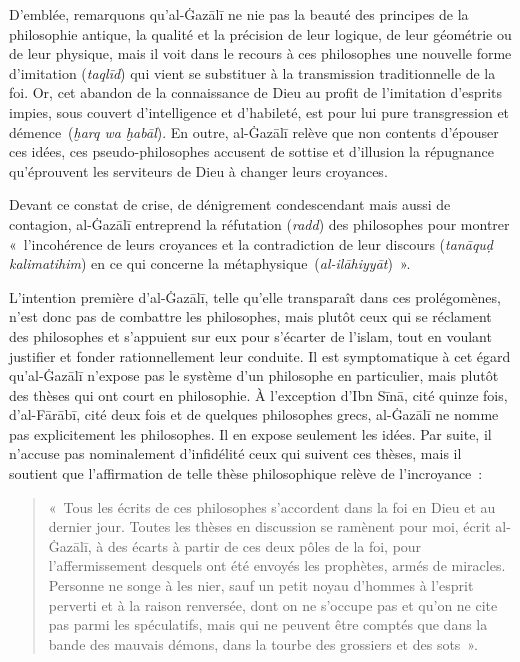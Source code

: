 D'emblée, remarquons qu'al-Ġazālī \label{theol:AlGazali4} ne nie pas la beauté des principes de
la philosophie antique, la qualité et la précision de leur logique, de
leur géométrie ou de leur physique, mais il voit dans le recours à ces
philosophes une nouvelle forme d'imitation (\emph{taqlīd}) qui vient se
substituer à la transmission traditionnelle de la foi. Or, cet abandon
de la connaissance de Dieu au profit de l'imitation d'esprits impies,
sous couvert d'intelligence et d'habileté, est pour lui pure
transgression et démence~(\emph{ḫarq wa ḫabāl}). En outre, al-Ġazālī relève que non contents d'épouser ces
idées, ces pseudo-philosophes accusent de sottise et d'illusion la
répugnance qu'éprouvent les serviteurs de Dieu à changer leurs
croyances.

Devant ce constat de crise, de dénigrement condescendant mais aussi de
contagion, al-Ġazālī  \label{theol:AlGazali5} entreprend la réfutation (\emph{radd}) des
philosophes pour montrer «~l'incohérence de leurs croyances et la
contradiction de leur discours (\emph{tanāquḍ kalimatihim}) en ce qui
concerne la métaphysique~(\emph{al-ilāhiyyāt})~».

L'intention première d'al-Ġazālī, telle qu'elle transparaît dans ces
prolégomènes, n'est donc pas de combattre les philosophes, mais plutôt
ceux qui se réclament des philosophes et s'appuient sur eux pour
s'écarter de l'islam, tout en voulant justifier et fonder
rationnellement leur conduite. Il est symptomatique à cet égard
qu'al-Ġazālī n'expose pas le système d'un philosophe en particulier,
mais plutôt des thèses qui ont court en philosophie. À l'exception d'Ibn
Sīnā, cité quinze fois, d'al-Fārābī, cité deux fois et de quelques
philosophes grecs, al-Ġazālī \label{theol:AlGazali6} ne nomme pas explicitement les philosophes.
Il en expose seulement les idées. Par suite, il n'accuse pas
nominalement d'infidélité ceux qui suivent ces thèses, mais il soutient
que l'affirmation de telle thèse philosophique relève de l'incroyance~:

\begin{quote}
«~Tous les écrits de ces philosophes s'accordent dans la foi en Dieu et
au dernier jour. Toutes les thèses en discussion se ramènent pour moi,
écrit al-Ġazālī, à des écarts à partir de ces deux pôles de la foi, pour
l'affermissement desquels ont été envoyés les prophètes, armés de
miracles. Personne ne songe à les nier, sauf un petit noyau d'hommes à
l'esprit perverti et à la raison renversée, dont on ne s'occupe pas et
qu'on ne cite pas parmi les spéculatifs, mais qui ne peuvent être
comptés que dans la bande des mauvais démons, dans la tourbe des
grossiers et des sots~».
\end{quote}

